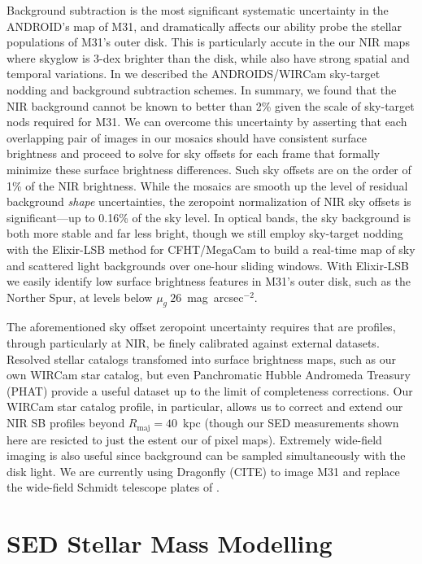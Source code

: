 \documentclass{iau}
\begin{document}
Background subtraction is the most significant systematic uncertainty in the ANDROID's map of M31, and dramatically affects our ability probe the stellar populations of M31's outer disk.
This is particularly accute in the our NIR maps where skyglow is 3-dex brighter than the disk, while also have strong spatial and temporal variations.
In \cite{Sick:2014} we described the ANDROIDS/WIRCam sky-target nodding and background subtraction schemes.
In summary, we found that the NIR background cannot be known to better than 2\% given the scale of sky-target nods required for M31.
We can overcome this uncertainty by asserting that each overlapping pair of images in our mosaics should have consistent surface brightness and proceed to solve for sky offsets for each frame that formally minimize these surface brightness differences.
Such sky offsets are on the order of 1\% of the NIR brightness.
While the mosaics are smooth up the level of residual background \emph{shape} uncertainties, the zeropoint normalization of NIR sky offsets is significant---up to 0.16\% of the sky level.
In optical bands, the sky background is both more stable and far less bright, though we still employ sky-target nodding with the Elixir-LSB method for CFHT/MegaCam to build a real-time map of sky and scattered light backgrounds over one-hour sliding windows.
With Elixir-LSB we easily identify low surface brightness features in M31's outer disk, such as the Norther Spur, at levels below $\mu_g~26$~mag~arcsec$^{-2}$.

The aforementioned sky offset zeropoint uncertainty requires that are profiles, through particularly at NIR, be finely calibrated against external datasets.
Resolved stellar catalogs transfomed into surface brightness maps, such as our own WIRCam star catalog, but even Panchromatic Hubble Andromeda Treasury (PHAT) provide a useful dataset up to the limit of completeness corrections.
Our WIRCam star catalog profile, in particular, allows us to correct and extend our NIR SB profiles beyond $R_\mathrm{maj}=40$~kpc (though our SED measurements shown here are resicted to just the estent our of pixel maps).
Extremely wide-field imaging is also useful since background can be sampled simultaneously with the disk light.
We are currently using Dragonfly (CITE) to image M31 and replace the wide-field Schmidt telescope plates of \cite{Walterbos:1987}.

\section{SED Stellar Mass Modelling}
\end{document}
